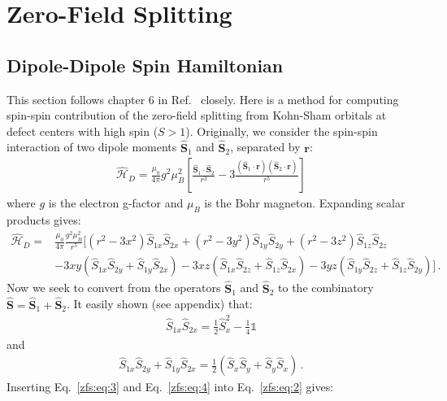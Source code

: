 \def\bS{\mathbf{\hat{S}}}
\def\bD{\mathbf{D}}
\def\H{\mathcal{\hat{H}}_D}
\def\br{\mathbf{r}}
\def\bR{\mathbf{R}}
\def\bG{\mathbf{G}}
\def\bC{\mathbf{C}}
\def\intinf{\int_{-\infty}^{\infty}}

\newcommand{\svar}[1]{\hat{S}_{#1}}
\newcommand{\ovar}[1]{\hat{\sigma}_{#1}}

\chapter{Zero-Field Splitting}

\section{Dipole-Dipole Spin Hamiltonian}

This section follows chapter 6 in Ref.~\cite{weil2007electron} closely. Here is a method for computing spin-spin contribution of the zero-field splitting from Kohn-Sham orbitals at defect centers with high spin ($S > 1$). Originally, we consider the spin-spin interaction of two dipole moments $\bS_1$ and $\bS_2$, separated by $\br$:
\begin{align}
    \H = \frac{\mu_0}{4\pi}g^2\mu_B^2\left[\frac{ \bS_1\cdot\bS_2}{r^3}-3\frac{(\bS_1\cdot\br)(\bS_2\cdot\br)}{r^5} \right]
    \label{zfs:eq:1}
\end{align}
where $g$ is the electron g-factor and $\mu_B$ is the Bohr magneton. Expanding scalar products gives:
\begin{align}
    \H =& \frac{\mu_0}{4\pi}\frac{g^2\mu_B^2}{r^5}\bigg[ (r^2-3x^2)\svar{1x}\svar{2x}
    + (r^2-3y^2)\svar{1y}\svar{2y} + (r^2-3z^2)\svar{1z}\svar{2z} \label{zfs:eq:2} \\
    & - 3xy(\svar{1x}\svar{2y}+\svar{1y}\svar{2x}) - 3xz(\svar{1x}\svar{2z}+\svar{1z}\svar{2x})
    - 3yz(\svar{1y}\svar{2z}+\svar{1z}\svar{2y}) \bigg] \nonumber \, .
\end{align}
Now we seek to convert from the operators $\bS_1$ and $\bS_2$ to the combinatory $\bS = \bS_1+\bS_2$. It easily shown (see appendix) that:
\begin{align}
    \svar{1x}\svar{2x}=\frac{1}{2}\hat{S}_x^2-\frac{1}{4}\mathbb{1}
    \label{zfs:eq:3}
\end{align}
and
\begin{align}
    \svar{1x}\svar{2y}+\svar{1y}\svar{2x}=\frac{1}{2}(\hat{S}_x\hat{S}_y+\hat{S}_y\hat{S}_x)\, .
    \label{zfs:eq:4}
\end{align}
Inserting Eq.~\ref{zfs:eq:3} and Eq.~\ref{zfs:eq:4} into Eq.~\ref{zfs:eq:2} gives:
